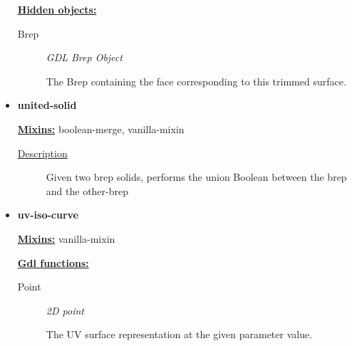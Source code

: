 \documentclass [11pt]{book}
\begin{document}
\begin{itemize}
\begin{description}
\end{description}






\textbf{
\underline{Hidden objects:}}

\begin{description}

\item [Brep]
\emph{GDL Brep Object}

 The Brep containing the face corresponding to this trimmed surface.




\end{description}







\item {}
\label{prim:united-solid}
\textbf{united-solid}


\textbf{
\underline{Mixins:}} boolean-merge, vanilla-mixin





\begin{description}

\item [
\underline{Description}]


Given two brep solids, performs the union Boolean between the brep and the other-brep



\end{description}









\item {}
\label{prim:uv-iso-curve}
\textbf{uv-iso-curve}


\textbf{
\underline{Mixins:}} vanilla-mixin





\begin{description}

\end{description}








\textbf{
\underline{Gdl functions:}}

\begin{description}

\item [Point]
\emph{2D point}

 The UV surface representation at the given parameter value.




\end{description}







\end{itemize}
\end{document}
